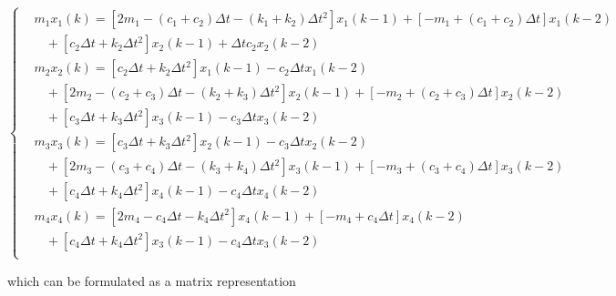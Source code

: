 \begin{equation}
    \left\{\begin{aligned}
    & {{m}_{1}}{{x}_{1}}(k)=[2{{m}_{1}}-({c}_{1}+{c}_{2})\Delta t-({k}_{1}+{k}_{2})\Delta {t}^{2}]{{x}_{1}}(k-1)+[-{m}_{1}+({c}_{1}+{c}_{2})\Delta t]{{x}_{1}}(k-2) \\ 
    & \ \ \ \ +[{c}_{2}\Delta t+{k}_{2}\Delta {t}^{2}]{{x}_{2}}(k-1)+\Delta t{{c}_{2}}{{x}_{2}}(k-2) \\ 
    & {{m}_{2}}{{x}_{2}}(k)=[{c}_{2}\Delta t+{k}_{2}\Delta {t}^{2}]{{x}_{1}}(k-1)-{c}_{2}\Delta t{{x}_{1}}(k-2) \\ 
    & \ \ \ \ +[2{{m}_{2}}-({c}_{2}+{c}_{3})\Delta t-({k}_{2}+{k}_{3})\Delta {t}^{2}]{{x}_{2}}(k-1)+[-{m}_{2}+({c}_{2}+{c}_{3})\Delta t]{{x}_{2}}(k-2) \\ 
    & \ \ \ \ +[{c}_{3}\Delta t+{k}_{3}\Delta {t}^{2}]{{x}_{3}}(k-1)-{c}_{3}\Delta t{{x}_{3}}(k-2) \\ 
    & {{m}_{3}}{{x}_{3}}(k)=[{c}_{3}\Delta t+{k}_{3}\Delta {t}^{2}]{{x}_{2}}(k-1)-{c}_{3}\Delta t{{x}_{2}}(k-2) \\ 
    & \ \ \ \ +[2{m}_{3}-({c}_{3}+{c}_{4})\Delta t-({k}_{3}+{k}_{4})\Delta {t}^{2}]{{x}_{3}}(k-1)+[-{m}_{3}+({c}_{3}+{c}_{4})\Delta t]{{x}_{3}}(k-2) \\ 
    & \ \ \ \ +[{c}_{4}\Delta t+{k}_{4}\Delta {t}^{2}]{{x}_{4}}(k-1)-{c}_{4}\Delta t{{x}_{4}}(k-2) \\ 
    & {{m}_{4}}{{x}_{4}}(k)=[2{m}_{4}-{c}_{4}\Delta t-{k}_{4}\Delta {t}^{2}]{{x}_{4}}(k-1)+[-{m}_{4}+{c}_{4}\Delta t]{{x}_{4}}(k-2) \\ 
    & \ \ \ \ +[{c}_{4}\Delta t+{k}_{4}\Delta {t}^{2}]{{x}_{3}}(k-1)-{c}_{4}\Delta t{{x}_{3}}(k-2) \\ 
    \end{aligned} \right. \label{eqS26}
\end{equation}

\noindent which can be formulated as a matrix representation

